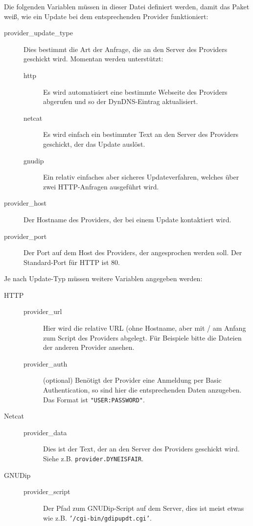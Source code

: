 Die folgenden Variablen müssen in dieser Datei definiert werden, damit das
Paket weiß, wie ein Update bei dem entsprechenden Provider funktioniert:

\begin{description}
\item[provider\_update\_type] Dies bestimmt die Art der Anfrage, die an
	den Server des Providers geschickt wird. Momentan werden unterstützt:
	\begin{description}
	\item[http] Es wird automatisiert eine bestimmte Webseite des
		Providers abgerufen und so der DynDNS-Eintrag aktualisiert.
	\item[netcat] Es wird einfach ein bestimmter Text an den Server des
		Providers geschickt, der das Update auslöst.
	\item[gnudip] Ein relativ einfaches aber sicheres Updateverfahren,
		welches über zwei HTTP-Anfragen ausgeführt wird.
	\end{description}
\item[provider\_host] Der Hostname des Providers, der bei einem Update
	kontaktiert wird.
\item[provider\_port] Der Port auf dem Host des Providers, der
	angesprochen werden soll. Der Standard-Port für HTTP ist 80.
\end{description}

Je nach Update-Typ müssen weitere Variablen angegeben werden:

\begin{description}
\item[HTTP]

\begin{description}
\item[provider\_url] Hier wird die relative URL (ohne Hostname, aber mit / am
	Anfang zum Script des Providers abgelegt. Für Beispiele bitte die Dateien
	der anderen Provider ansehen.
\item[provider\_auth] (optional) Benötigt der Provider eine Anmeldung per
	Basic Authentication, so sind hier die entsprechenden Daten anzugeben. Das
	Format ist \texttt{"{}USER:PASSWORD"{}}.
\end{description}

\item[Netcat]

\begin{description}
\item[provider\_data] Dies ist der Text, der an den Server des Providers
	geschickt wird. Siehe z.B. \texttt{provider.DYNEISFAIR}.
\end{description}

\item[GNUDip]

\begin{description}
\item[provider\_script] Der Pfad zum GNUDip-Script auf dem Server, dies ist
	meist etwas wie z.B. \texttt{'/cgi-bin/gdipupdt.cgi'}.
\end{description}
\end{description}


